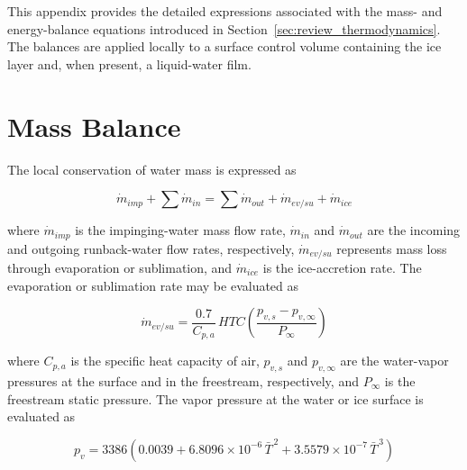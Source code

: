 \label{app:thermodynamic_model}

This appendix provides the detailed expressions associated with the mass- and energy-balance equations introduced in Section~\ref{sec:review_thermodynamics}. The balances are applied locally to a surface control volume containing the ice layer and, when present, a liquid-water film.

\section{Mass Balance}

The local conservation of water mass is expressed as

\begin{equation}
    \dot{m}_{imp}
    + \sum \dot{m}_{in}
    =
    \sum \dot{m}_{out}
    + \dot{m}_{ev/su}
    + \dot{m}_{ice}
    \label{eq:app_mass_balance}
\end{equation}

where $\dot{m}_{imp}$ is the impinging-water mass flow rate, $\dot{m}_{in}$ and $\dot{m}_{out}$ are the incoming and outgoing runback-water flow rates, respectively, $\dot{m}_{ev/su}$ represents mass loss through evaporation or sublimation, and $\dot{m}_{ice}$ is the ice-accretion rate. The evaporation or sublimation rate may be evaluated as

\begin{equation}
    \dot{m}_{ev/su}
    =
    \frac{0.7}{C_{p,a}}\,HTC
    \left(
        \frac{p_{v,s}-p_{v,\infty}}{P_\infty}
    \right)
    \label{eq:app_evaporation}
\end{equation}

where $C_{p,a}$ is the specific heat capacity of air, $p_{v,s}$ and $p_{v,\infty}$ are the water-vapor pressures at the surface and in the freestream, respectively, and $P_\infty$ is the freestream static pressure. The vapor pressure at the water or ice surface is evaluated as~\cite{ozgen2009ice}

\begin{equation}
    p_v
    =
    3386
    \left(
        0.0039
        + 6.8096 \times 10^{-6}\,\bar{T}^{\,2}
        + 3.5579 \times 10^{-7}\,\bar{T}^{\,3}
    \right)
    \label{eq:app_vapor_pressure}
\end{equation}

